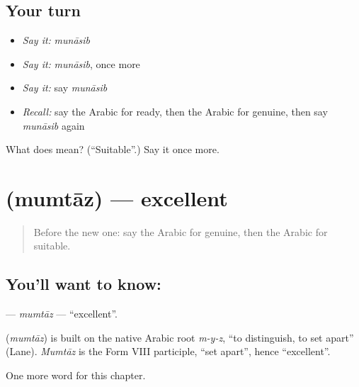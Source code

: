 \subsection*{Your turn}
\begin{itemize}
\raggedright
  \item \emph{Say it:} \emph{munāsib}
  \item \emph{Say it:} \emph{munāsib}, once more
  \item \emph{Say it:} say \emph{munāsib}
  \item \emph{Recall:} say the Arabic for ready, then the Arabic for genuine, then say \emph{munāsib} again
\end{itemize}

\begin{tcolorbox}[breakable,colback=teal!4,colframe=teal!35!black,title={Before you move on}]
What does  mean? (\textquotedblleft{}Suitable\textquotedblright{}.) Say it once more.
\end{tcolorbox}
\section[\texorpdfstring{\ar{ممتاز} (mumtāz)}{ممتاز (mumtāz)}]{ (mumtāz) — excellent}

\label{lesson:AR-C240-mumtaz}



\begin{quote}
Before the new one: say the Arabic for genuine, then the Arabic for suitable.
\end{quote}

\subsection*{You'll want to know: }
\textbf{} — \emph{mumtāz} — \textquotedblleft{}excellent\textquotedblright{}.

\begin{cousinweb}
\textbf{} (\emph{mumtāz}) is built on the native Arabic root \emph{m-y-z}, \textquotedblleft{}to distinguish, to set apart\textquotedblright{} (Lane). \emph{Mumtāz} is the Form VIII participle, \textquotedblleft{}set apart\textquotedblright{}, hence \textquotedblleft{}excellent\textquotedblright{}.
\end{cousinweb}

\begin{grammarlens}[title={What you've built}]
One more word for this chapter.
\end{grammarlens}

